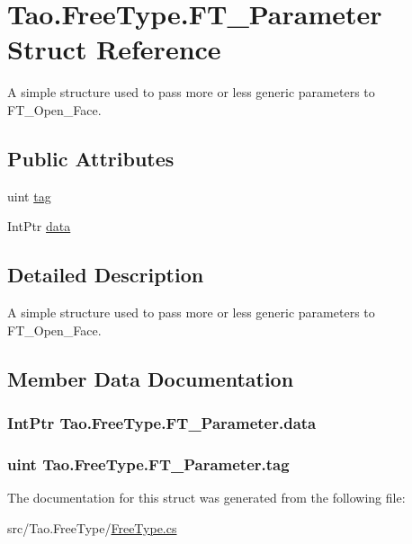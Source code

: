 \hypertarget{struct_tao_1_1_free_type_1_1_f_t___parameter}{
\section{Tao.FreeType.FT\_\-Parameter Struct Reference}
\label{struct_tao_1_1_free_type_1_1_f_t___parameter}
}


A simple structure used to pass more or less generic parameters to FT\_\-Open\_\-Face.  


\subsection*{Public Attributes}
\begin{DoxyCompactItemize}
\item 
uint \hyperlink{struct_tao_1_1_free_type_1_1_f_t___parameter_aa7fd0cce44979db4f79b015ad44e5198}{tag}
\item 
IntPtr \hyperlink{struct_tao_1_1_free_type_1_1_f_t___parameter_ac49a6d737f9cbd1773f157424b706bda}{data}
\end{DoxyCompactItemize}


\subsection{Detailed Description}
A simple structure used to pass more or less generic parameters to FT\_\-Open\_\-Face. 

\subsection{Member Data Documentation}
\hypertarget{struct_tao_1_1_free_type_1_1_f_t___parameter_ac49a6d737f9cbd1773f157424b706bda}{
\subsubsection[{data}]{\setlength{\rightskip}{0pt plus 5cm}IntPtr {\bf Tao.FreeType.FT\_\-Parameter.data}}}
\label{struct_tao_1_1_free_type_1_1_f_t___parameter_ac49a6d737f9cbd1773f157424b706bda}
\hypertarget{struct_tao_1_1_free_type_1_1_f_t___parameter_aa7fd0cce44979db4f79b015ad44e5198}{
\subsubsection[{tag}]{\setlength{\rightskip}{0pt plus 5cm}uint {\bf Tao.FreeType.FT\_\-Parameter.tag}}}
\label{struct_tao_1_1_free_type_1_1_f_t___parameter_aa7fd0cce44979db4f79b015ad44e5198}


The documentation for this struct was generated from the following file:\begin{DoxyCompactItemize}
\item 
src/Tao.FreeType/\hyperlink{_free_type_8cs}{FreeType.cs}\end{DoxyCompactItemize}
